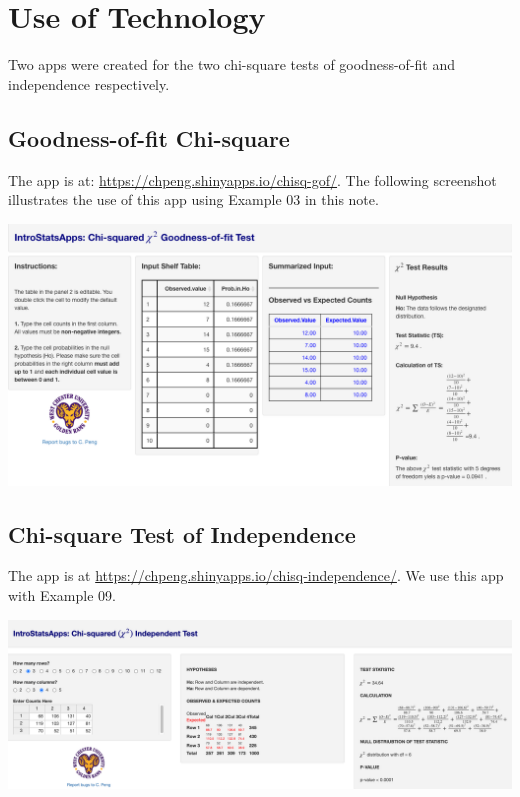 \documentclass[
]{article}
\begin{document}
\hypertarget{use-of-technology}{%
\section{Use of Technology}\label{use-of-technology}}

Two apps were created for the two chi-square tests of goodness-of-fit
and independence respectively.

\hypertarget{goodness-of-fit-chi-square}{%
\subsection{Goodness-of-fit
Chi-square}\label{goodness-of-fit-chi-square}}

The app is at: \url{https://chpeng.shinyapps.io/chisq-gof/}. The
following screenshot illustrates the use of this app using Example 03 in
this note.

\begin{center}\includegraphics[width=1\linewidth]{week13/useTech01} \end{center}

\hypertarget{chi-square-test-of-independence-1}{%
\subsection{Chi-square Test of
Independence}\label{chi-square-test-of-independence-1}}

The app is at \url{https://chpeng.shinyapps.io/chisq-independence/}. We
use this app with Example 09.

\begin{center}\includegraphics[width=1\linewidth]{week13/useTech02} \end{center}
\end{document}
